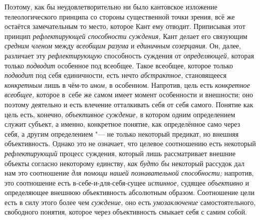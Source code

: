 Поэтому, как бы неудовлетворительно ни было кантовское
изложение телеологического принципа со стороны существенной точки зрения,
всё же остаётся замечательным то место, которое Кант ему отводит.
Приписывая этот принцип {\em рефлектирующей способности суждения,}
Кант делает его связующим {\em средним членом} между {\em всеобщим разума}
и {\em единичным созерцания}. Он, далее, различает эту
{\em рефлектирующую} способность суждения от {\em определяющей,}
которая только {\em подводит} особенное под всеобщее. Такое всеобщее,
которое только {\em подводит} под себя единичности, есть нечто
{\em абстрактное,} становящееся {\em конкретным} лишь в чём-то {\em ином,}
в особенном. Напротив, цель есть {\em конкретное всеобщее,}
которое в~себе же самом имеет момент особенности и внешности;
оно поэтому деятельно и есть влечение отталкивать себя от себя самого.
Понятие как цель есть, конечно, {\em объективное суждение,}
в котором одним определением служит субъект, а именно,
конкретное понятие, как определённое само через себя, а другим
определением "--- не только некоторый предикат, но внешняя
объективность. Однако это не означает, что целевое соотношению есть
некоторый {\em рефлектирующий} процесс суждения, который лишь рассматривает
внешние объекты согласно некоторому единству, {\em как будто бы} некоторый
рассудок дал нам это соотношение {\em для помощи нашей познавательной
способности;} напротив, это соотношение есть
в-себе-и-для-себя-сущее {\em истинное,} судящее {\em объективно}
и определяющее внешнюю объективность абсолютным образом.
Соотношение цели есть в силу этого более чем {\em суждение,} оно есть
{\em умозаключение} самостоятельного, свободного понятия, которое через
объективность смыкает себя с самим собой.


